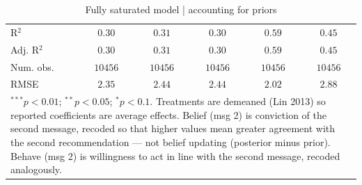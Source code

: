 \begin{table}
\begin{center}
\begin{tabular}{l c c c c c}
\hline
R$^2$                                             & $0.30$        & $0.31$        & $0.30$       & $0.59$        & $0.45$        \\
Adj. R$^2$                                        & $0.30$        & $0.31$        & $0.30$       & $0.59$        & $0.45$        \\
Num. obs.                                         & $10456$       & $10456$       & $10456$      & $10456$       & $10456$       \\
RMSE                                              & $2.35$        & $2.44$        & $2.44$       & $2.02$        & $2.88$        \\
\hline
\multicolumn{6}{l}{\scriptsize{\item $^{***}p<0.01$; $^{**}p<0.05$; $^{*}p<0.1$. Treatments are demeaned (Lin 2013) so reported coefficients are average effects. Belief (msg 2) is conviction of the second message, recoded so that higher values mean greater agreement with the second recommendation --- not belief updating (posterior minus prior). Behave (msg 2) is willingness to act in line with the second message, recoded analogously.}}
\end{tabular}
\caption{Fully saturated model | accounting for priors}
\label{table:saturated_priors}
\end{center}
\end{table}


